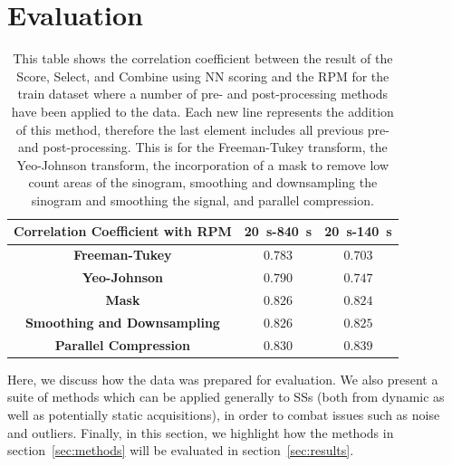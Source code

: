 \section{Evaluation} \label{sec:evaluation}
    \begin{table}
        \centering
        
        \captionsetup{singlelinecheck=false}
        \caption{This table shows the correlation coefficient between the result of the Score, Select, and Combine using \gls{NN} scoring and the \gls{RPM} for the train dataset where a number of pre- and post-processing methods have been applied to the data. Each new line represents the addition of this method, therefore the last element includes all previous pre- and post-processing. This is for the Freeman-Tukey transform, the Yeo-Johnson transform, the incorporation of a mask to remove low count areas of the sinogram, smoothing and downsampling the sinogram and smoothing the signal, and parallel compression.}
        
        \begin{tabular}{||c||c|c||}
            \hline
            \textbf{Correlation Coefficient with RPM}   & \SI{20}{\second}-\SI{840}{\second}    & \SI{20}{\second}-\SI{140}{\second} \\
            \hline
            \hline
            \textbf{Freeman-Tukey}                      & $0.783$                               & $0.703$ \\
            \hline
            \textbf{Yeo-Johnson}                        & $0.790$                               & $0.747$ \\
            \hline
            \textbf{Mask}                               & $0.826$                               & $0.824$ \\
            \hline
            \textbf{Smoothing and Downsampling}         & $0.826$                               & $0.825$ \\
            \hline
            \textbf{Parallel Compression}              & $0.830$                                & $0.839$ \\
            \hline
        \end{tabular}
        \label{tab:pre_and_post_processing_correlation}
    \end{table}
    
    Here, we discuss how the data was prepared for evaluation. We also present a suite of methods which can be applied generally to \glspl{SS} (both from dynamic as well as potentially static acquisitions), in order to combat issues such as noise and outliers. Finally, in this section, we highlight how the methods in section~\ref{sec:methods} will be evaluated in section~\ref{sec:results}.
        
